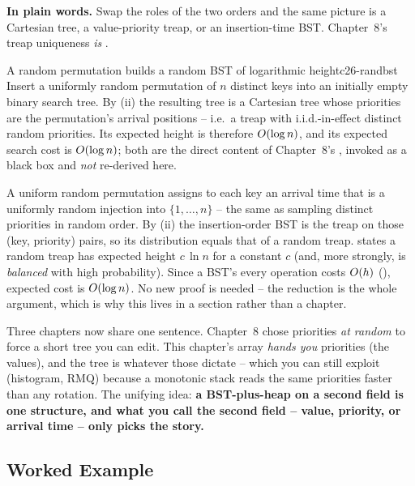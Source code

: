 \noindent\textbf{In plain words.} Swap the roles of the two orders and the same picture is a Cartesian
tree, a value-priority treap, or an insertion-time BST. Chapter~8's treap uniqueness \emph{is}
.

\begin{theorem}{A random permutation builds a random BST of logarithmic height}{c26-randbst}
Insert a uniformly random permutation of $n$ distinct keys into an initially empty binary search tree.
By (ii) the resulting tree is a Cartesian tree whose priorities are the
permutation's arrival positions -- i.e.\ a treap with i.i.d.-in-effect distinct random priorities. Its
expected height is therefore $O(\log n)$, and its expected search cost is $O(\log n)$; both are
the direct content of Chapter~8's , invoked as a black box and \emph{not}
re-derived here.
\end{theorem}
\begin{proofbox}
A uniform random permutation assigns to each key an arrival time that is a uniformly random injection
into $\{1,\dots,n\}$ -- the same as sampling distinct priorities in random order. By
(ii) the insertion-order BST is the treap on those (key, priority) pairs, so its
distribution equals that of a random treap.  states a random treap has expected
height $c\,\ln n$ for a constant $c$ (and, more strongly, is \emph{balanced} with high probability). Since
a BST's every operation costs $O(h)$ (), expected cost is $O(\log n)$. No
new proof is needed -- the reduction is the whole argument, which is why this lives in a section rather
than a chapter. \end{proofbox}

\begin{insightbox}
Three chapters now share one sentence. Chapter~8 chose priorities \emph{at random} to force a short tree
you can edit. This chapter's array \emph{hands you} priorities (the values), and the tree is whatever
those dictate -- which you can still exploit (histogram, RMQ) because a monotonic stack reads the same
priorities faster than any rotation. The unifying idea: \textbf{a BST-plus-heap on a second field is one
structure, and what you call the second field -- value, priority, or arrival time -- only picks the story.}
\end{insightbox}

\subsection{Worked Example}

